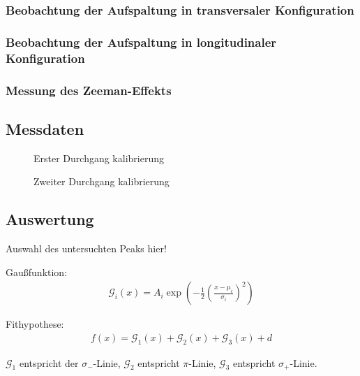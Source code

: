 \documentclass[11pt, a4paper]{article}
\begin{document}
\subsubsection{Beobachtung der Aufspaltung in transversaler Konfiguration}

\subsubsection{Beobachtung der Aufspaltung in longitudinaler Konfiguration}




\subsubsection{Messung des Zeeman-Effekts}



\subsection{Messdaten}
\FloatBarrier

\begin{figure}[h]
\centering

\caption{Erster Durchgang kalibrierung}
\label{fig:kalibrierung1}
\end{figure}

\begin{figure}[h]
\centering

\caption{Zweiter Durchgang kalibrierung}
\label{fig:kalibrierung2}
\end{figure}



\FloatBarrier
\subsection{Auswertung}
Auswahl des untersuchten Peaks hier!

Gaußfunktion:
\begin{align}
	\mathcal{G}_i(x) = A_i \exp\left( -\frac{1}{2} \left( \frac{x - \mu_i}{\sigma_i} \right)^2 \right)
\end{align}

Fithypothese:
\begin{align}
	f(x) = \mathcal{G}_1(x) + \mathcal{G}_2(x) + \mathcal{G}_3(x) + d
\end{align}

$\mathcal{G}_1$ entspricht der $\sigma_-$-Linie, $\mathcal{G}_2$ entspricht $\pi$-Linie, $\mathcal{G}_3$ entspricht $\sigma_+$-Linie.
\end{document}
